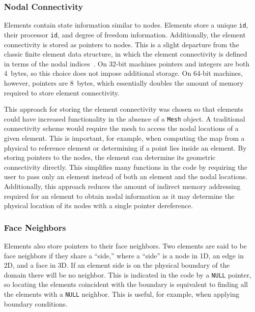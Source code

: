 \subsubsection{Nodal Connectivity\label{sec:elements_connectivity}}
Elements contain state information similar to nodes.  Elements store a
unique \texttt{id}, their processor \texttt{id}, and degree of freedom information.
Additionally, the element connectivity is stored as pointers to nodes.
This is a slight departure from the classic finite element data
structure, in which the element connectivity is defined in terms of
the nodal indices~\cite{becker_carey_oden_volume_1}.  On 32-bit
machines pointers and integers are both 4~bytes, so this choice does
not impose additional storage.  On 64-bit machines, however, pointers
are 8~bytes, which essentially doubles the amount of memory required
to store element connectivity.

This approach for storing the element connectivity was chosen so that
elements could have increased functionality in the absence of a
\texttt{Mesh} object.  A traditional connectivity scheme would require
the mesh to access the nodal locations of a given element.  This is
important, for example, when computing the map from a physical to
reference element or determining if a point lies inside an element.
By storing pointers to the nodes, the element can determine its
geometric connectivity directly.  This simplifies many functions in
the code by requiring the user to pass only an element instead of both
an element and the nodal locations. Additionally, this approach
reduces the amount of indirect memory addressing required for an
element to obtain nodal information as it may determine the physical
location of its nodes with a single pointer dereference.

\subsubsection{Face Neighbors\label{sec:elements_neighbors}}
Elements also store pointers to their face neighbors.  Two elements
are said to be face neighbors if they share a ``side,'' where a
``side'' is a node in 1D, an edge in 2D, and a face in 3D.  If an
element side is on the physical boundary of the domain there will be
no neighbor.  This is indicated in the code by a \texttt{NULL}
pointer, so locating the elements coincident with the boundary is
equivalent to finding all the elements with a \texttt{NULL} neighbor.
This is useful, for example, when applying boundary conditions.

